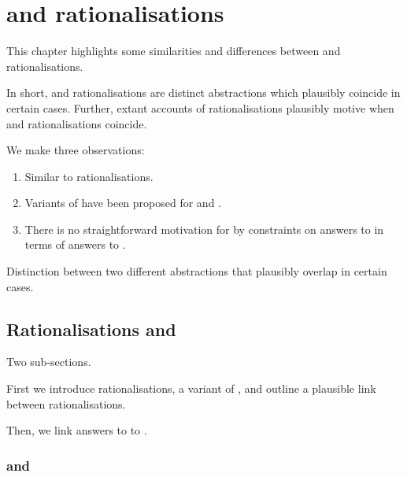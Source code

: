 \chapter{\issueInclusion{} and rationalisations}
\label{sec:reasons}


\begin{note}
  This chapter highlights some similarities and differences between  and rationalisations.

  In short,  and rationalisations are distinct abstractions which plausibly coincide in certain cases.
  Further, extant accounts of rationalisations plausibly motive \issueInclusion{} when  and rationalisations coincide.
\end{note}

\begin{note}
  We make three observations:

  \begin{enumerate}
  \item
    Similar to rationalisations.
  \item
    Variants of \issueInclusion{} have been proposed for \qWhyR{} and \qHow{}.
  \item
    There is no straightforward motivation for \issueInclusion{} by constraints on answers to \qWhyR{} in terms of answers to \qHow{}.
  \end{enumerate}
\end{note}


\begin{note}
  Distinction between two different abstractions that plausibly overlap in certain cases.
\end{note}


\section{Rationalisations and \qWhyR{}}

\begin{note}
  Two sub-sections.

  First we introduce rationalisations, a variant of \qWhy{}, and outline a plausible link between rationalisations.

  Then, we link answers to \qWhy{} to \qWhyR{}.
\end{note}


\subsection{\qWhy{} and \qWhyR{}}

